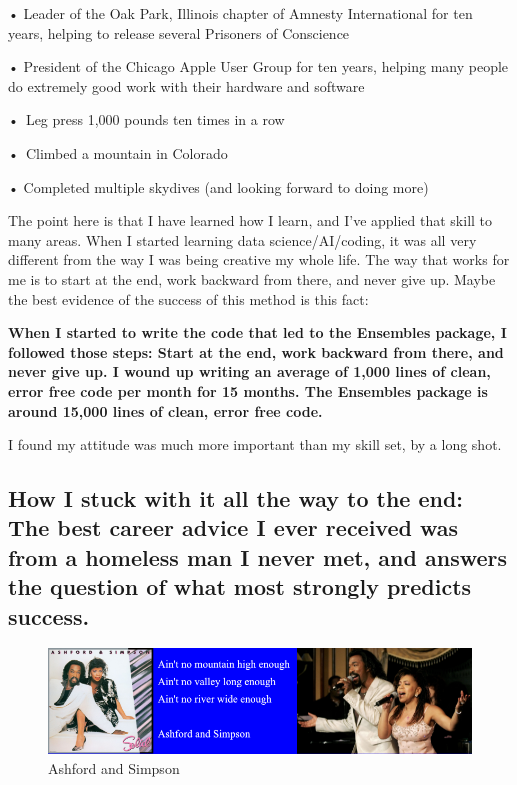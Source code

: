 \documentclass[
]{book}
\begin{document}
• Leader of the Oak Park, Illinois chapter of Amnesty International for
ten years, helping to release several Prisoners of Conscience

• President of the Chicago Apple User Group for ten years, helping many
people do extremely good work with their hardware and software

•~Leg press 1,000 pounds ten times in a row

•~Climbed a mountain in Colorado

• Completed multiple skydives (and looking forward to doing more)

The point here is that I have learned how I learn, and I've applied that
skill to many areas. When I started learning data science/AI/coding, it
was all very different from the way I was being creative my whole life.
The way that works for me is to start at the end, work backward from
there, and never give up. Maybe the best evidence of the success of this
method is this fact:

\textbf{When I started to write the code that led to the Ensembles package, I
followed those steps: Start at the end, work backward from there, and
never give up. I wound up writing an average of 1,000 lines of clean,
error free code per month for 15 months. The Ensembles package is around
15,000 lines of clean, error free code.}

I found my attitude was much more important than my skill set, by a long
shot.

\subsection{How I stuck with it all the way to the end: The best career advice I ever received was from a homeless man I never met, and answers the question of what most strongly predicts success.}\label{how-i-stuck-with-it-all-the-way-to-the-end-the-best-career-advice-i-ever-received-was-from-a-homeless-man-i-never-met-and-answers-the-question-of-what-most-strongly-predicts-success.}

\begin{figure}
\centering
\includegraphics{_book/images/Ashford_and_Simpson.png}
\caption{Ashford and Simpson}
\end{figure}
\end{document}
